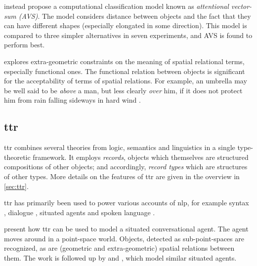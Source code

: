 \cite{RegierGroundingspatiallanguage2001a} instead propose a computational classification model known as \textit{attentional vector-sum (AVS)}.
The model considers distance between objects and the fact that they can have different shapes (especially elongated in some direction).
This model is compared to three simpler alternatives in seven experiments, and AVS is found to perform best.

\cite{CoventryInterplayGeometryFunction2001} explores extra-geometric constraints on the meaning of spatial relational terms, especially functional ones.
The functional relation between objects is significant for the acceptability of terms of spatial relations.
For example, an umbrella may be well said to be \textit{above} a man, but less clearly \textit{over} him, if it does not protect him from rain falling sideways in hard wind \citep{CoventryInterplayGeometryFunction2001}.




\subsection{\Gls{ttr}}
\label{sec:ttnlp}


\Gls{ttr} \citep{CooperRecordsRecordTypes2005} combines several theories from logic, semantics and linguistics in a single type-theoretic framework.
It employs \textit{records}, objects which themselves are structured compositions of other objects;
and accordingly, \textit{record types} which are structures of other types.
More details on the features of \gls{ttr} are given in the overview in \autoref{sec:ttr}.

\gls{ttr} has primarily been used to power various accounts of \gls{nlp}, for example
syntax \citep{CooperAustiniantruthattitudes2005, CooperRecordsRecordTypes2005, CooperTypetheorysemantics2012, CooperTypetheorylanguage2016},
dialogue \citep{Larssonformalviewcorrective2009, LarssonDialoguesHaveContent2011, CooperTypetheorylanguage2016},
situated agents \citep{DobnikModellinglanguageaction2012, ttrspat,lspc} and
spoken language \citep{CooperTypetheorylanguage2016}.


\cite{DobnikModellinglanguageaction2012} present how \gls{ttr} can be used to model a situated conversational agent.
The agent moves around in a point-space world.
Objects, detected as sub-point-spaces are recognized, as are (geometric and extra-geometric) spatial relations between them.
The work is followed up by \cite{ttrspat} and \cite{lspc}, which model similar situated agents.

